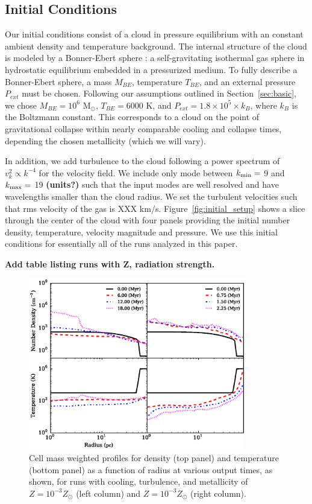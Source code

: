\documentclass[useAMS,usenatbib]{mn2e}
\newcommand{\msun}{{M$_\odot$}}
\begin{document}
\subsection{Initial Conditions}

Our initial conditions consist of a cloud in pressure equilibrium with an
constant ambient density and temperature background. The internal structure of the
cloud is modeled by a Bonner-Ebert sphere \cite{Bonnor1956}: a self-gravitating
isothermal gas sphere in hydrostatic equilibrium embedded in a pressurized  
medium. To fully describe a Bonner-Ebert sphere, a mass $M_{BE}$, temperature
$T_{BE}$, and an external pressure $P_{ext}$ must be chosen. Following our
assumptions outlined in Section~\ref{sec:basic}, we chose
$M_{BE}=10^6$ \msun, $T_{BE}=6000$ K, and $P_{ext}=1.8\times10^5\times k_B$, 
where $k_B$ is the Boltzmann constant. This corresponds to a cloud on the point of
gravitational collapse within nearly comparable cooling and collapse times,
depending the chosen metallicity (which we will vary).

In addition, we add turbulence to the cloud following a power spectrum of
$v_k^2 \propto k^{-4}$ for the velocity field.  We include only mode between
$k_{\rm min}=$ 9 and $k_{\rm max} =$ 19 {\bf (units?)} such that the input modes are well resolved
and have wavelengths smaller than the cloud radius.  We set the turbulent velocities
such that rms velocity of the gas is XXX km/s. Figure~\ref{fig:initial_setup} shows 
a slice through the center of the cloud with four panels providing
the initial number density, temperature, velocity magnitude and pressure.  We use
this initial conditions for essentially all of the runs analyzed in this paper.


{\bf Add table listing runs with Z, radiation strength.}

% 


\begin{figure}
\begin{center}
\includegraphics[width=9.5cm]{Images/profile_panel}
\end{center}
\caption{\label{fig:profiles} Cell mass weighted profiles for 
density (top panel) and temperature (bottom panel) as a function of radius at various 
output times, as shown, for runs with cooling, turbulence, and metallicity of $Z=10^{-3}Z_\odot$
(left column) and $Z=10^{-3}Z_\odot$ (right column).}
\end{figure}
\end{document}
